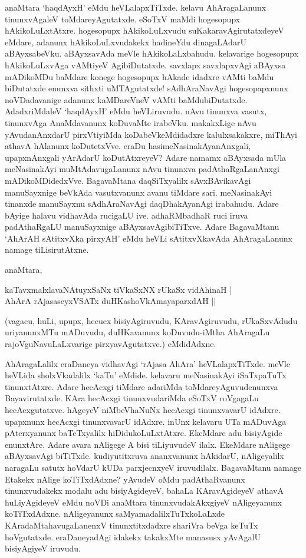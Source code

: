 anaMtara `haqdAyxH' eMdu heVLalapxTiTxde. kelavu AhAragaLanunx tinunxvAgaleV toMdareyAgutatxde. eSoTxV maMdi hogesopupx hAkikoLuLxtAtxre. hogesopupx hAkikoLuLxvudu suKakaravAgirutatxdeyeV eMdare, adanunx hAkikoLuLxvudakekx hadineYdu dinagaLAdarU aBAyxsabeVku. aBAyxsavAda meVle hAkikoLaLxbahudu. kelavarige hogesopupx hAkikoLuLxvAga vAMtiyeV AgibiDutatxde. savxlapx savxlapxvAgi aBAyxsa mADikoMDu baMdare konege hogesopupx hAkade idadxre vAMti baMdu biDutatxde enunxva sithxti uMTAgutatxde! sAdhAraNavAgi hogesopapxnunx noVDadavanige adanunx kaMDareVneV vAMti baMdubiDutatxde. AdadxriMdaleV `haqdAyxH' eMdu heVLiruvudu. nAvu tinunxva vasutx, tinunxvAga AnaMdavanunx koDuvaMte irabeVku. makakxLige nAvu yAvudanAnxdarU pirxVtiyiMda koDabeVkeMdidadxre kalulxsakakxre, miThAyi athavA hAlanunx koDutetxVve. eraDu hasimeNasinakAyanAnxgali, upapxnAnxgali yArAdarU koDutAtxreyeV? Adare namamx aBAyxsada mUla meNasinakAyi muMtAdavugaLanunx nAvu tinunxva padAthaRgaLanAnxgi mADikoMDidedxVve. BagavaMtana daqSiTxyalilx sAvxBAvikavAgi manuSayxnige beVkAda vasutxvanunx avanu tiMdare sari. meNasinakAyi tinanxde manuSayxnu sAdhAraNavAgi daqDhakAyanAgi irabahudu. Adare bAyige halavu vidhavAda rucigaLU ive. adhaRMbadhaR ruci iruva padAthaRgaLU manuSayxnige aBAyxsavAgibiTiTxve. Adare BagavaMtanu `AhArAH sAtitxvXka pirxyAH' eMdu heVLi sAtitxvXkavAda AhAragaLanunx namage tiLisirutAtxne.

anaMtara,

\begin{shloka}
kaTavxmalxlavaNAtuyxSaNx tiVkaSxNX rUkaSx vidAhinaH |\\
AhArA rAjasaseyxVSATx duHKashoVkAmayaparxdAH ||
\end{shloka}

(vagacu, huLi, upupx, hecucx bisiyAgiruvudu, KAravAgiruvudu, rUkaSxvAdudu uriyanunxMTu mADuvudu, duHKavanunx koDuvudu-iMtha AhAragaLu rajoVguNavuLaLxvarige pirxyavAgutatxve.) eMdidAdxne.

AhAragaLalilx eraDaneya vidhavAgi `rAjasa AhAra' heVLalapxTiTxde. meVle heVLida sholxVkadalilx `kaTu' eMdide. kelavaru meNasinakAyi iSaTxpaTuTx tinunxtAtxre. Adare hecAcxgi tiMdare adariMda toMdareyAguvudenunxva Bayavirutatxde. KAra hecAcxgi tinunxvudariMda eSoTxV roVgagaLu hecAcxgutatxve. hAgeyeV niMbeVhaNuNx hecAcxgi tinunxvavarU idAdxre. upapxnunx hecAcxgi tinunxvavarU idAdxre. inUnx kelavaru UTa mADuvAga pAterxyanunx baTeTxyalilx hiDidukoLuLxtAtxre. EkeMdare adu bisiyAgide enunxtAre. Adare avara nAligege A bisi tiLiyuvudeV ilalx. EkeMdare nAligege aBAyxsavAgi biTiTxde. kudiyutitxruva ananxvanunx hAkidarU, nAligeyalilx naragaLu satutx hoVdarU kUDa parxjecnxyeV iruvudilalx. BagavaMtanu namage Etakekx nAlige koTiTxdAdxne? yAvudeV oMdu padAthaRvanunx tinunxvudakekx modalu adu bisiyAgideyeV, bahaLa KAravAgideyeV athavA huLiyAgideyeV eMdu noVDi anaMtara tinunxvudakAkxgiyeV nAligeyanunx koTiTxdAdxne. nAligeyanunx saMyamadalilxTuTxkoLaLxde KAradaMtahavugaLanenxV tinunxtitxdadxre shariVra beVga keTuTx hoVgutatxde. eraDaneyadAgi idakekx takakxMte manasusx yAvAgalU bisiyAgiyeV iruvudu.

